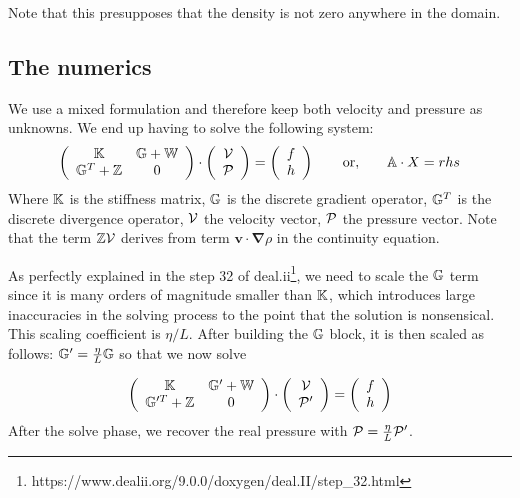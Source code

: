 Note that this presupposes that the density is not zero anywhere in the domain.


\subsection{The numerics}

We use a mixed formulation and therefore  
keep both velocity and pressure as unknowns. We end up having to solve 
the following system:
\[
\left(
\begin{array}{cc}
{\mathbb{K}} & {\mathbb{G}}+{\mathbb{W}} \\ {\mathbb{G}}^T+{\mathbb{Z}} & 0 
\end{array}
\right)
\cdot
\left(
\begin{array}{c}
{\cal V} \\ {\cal P}
\end{array}
\right)
=
\left(
\begin{array}{c}
 f \\ h
\end{array}
\right)
\quad\quad
{\rm or,}
\quad\quad
{\mathbb{A}} \cdot X = rhs
\]
Where ${\mathbb{K}}$ is the stiffness matrix, ${\mathbb{G}}$ is the discrete gradient operator, 
${\mathbb{G}}^T$ is the discrete divergence operator, ${\cal V}$ the velocity vector, 
${\cal P}$ the pressure vector.
Note that the term ${\mathbb{Z}}{\cal V}$ derives from term ${\bm v} \cdot {\bm \nabla} \rho$ in the continuity equation. 

As perfectly explained in the step 32 of deal.ii\footnote{https://www.dealii.org/9.0.0/doxygen/deal.II/step\_32.html},
we need to scale the ${\mathbb{G}}$ term since it is many orders of magnitude smaller than ${\mathbb{K}}$, which introduces large inaccuracies in the solving process to the point that the solution is nonsensical. This scaling coefficient is $\eta/L$. After building the ${\mathbb{G}}$ block, it is then scaled as follows: ${\mathbb{G}}'=\frac{\eta}{L}{\mathbb{G}}$ so that we now solve 

\[
\left(
\begin{array}{cc}
{\mathbb{K}} & {\mathbb{G}}'+{\mathbb{W}} \\ {\mathbb{G}}'^T+{\mathbb{Z}} & 0 
\end{array}
\right)
\cdot
\left(
\begin{array}{c}
{\cal V} \\ {\cal P}'
\end{array}
\right)
=
\left(
\begin{array}{c}
 f \\ h
\end{array}
\right)
\]
After the solve phase, we recover the real pressure with ${\cal P}=\frac{\eta}{L}{\cal P}'$.

